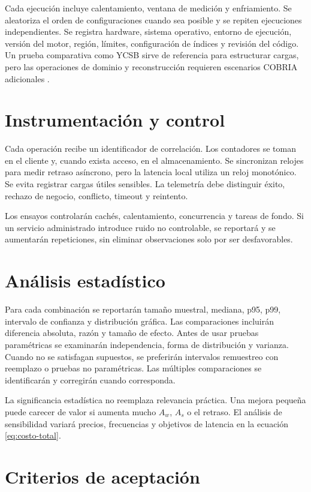 Cada ejecución incluye calentamiento, ventana de medición y enfriamiento. Se aleatoriza
el orden de configuraciones cuando sea posible y se repiten ejecuciones independientes.
Se registra hardware, sistema operativo, entorno de ejecución, versión del motor, región, límites,
configuración de índices y revisión del código. Un prueba comparativa como YCSB sirve de referencia
para estructurar cargas, pero las operaciones de dominio y reconstrucción requieren
escenarios COBRIA adicionales \parencite{cooper2010ycsb}.

\section{Instrumentación y control}

Cada operación recibe un identificador de correlación. Los contadores se toman en el
cliente y, cuando exista acceso, en el almacenamiento. Se sincronizan relojes para medir
retraso asíncrono, pero la latencia local utiliza un reloj monotónico. Se evita registrar
cargas útiles sensibles. La telemetría debe distinguir éxito, rechazo de negocio, conflicto,
timeout y reintento.

Los ensayos controlarán cachés, calentamiento, concurrencia y tareas de fondo. Si un
servicio administrado introduce ruido no controlable, se reportará y se aumentarán
repeticiones, sin eliminar observaciones solo por ser desfavorables.

\section{Análisis estadístico}

Para cada combinación se reportarán tamaño muestral, mediana, p95, p99, intervalo de
confianza y distribución gráfica. Las comparaciones incluirán diferencia absoluta,
razón y tamaño de efecto. Antes de usar pruebas paramétricas se examinarán independencia,
forma de distribución y varianza. Cuando no se satisfagan supuestos, se preferirán
intervalos remuestreo con reemplazo o pruebas no paramétricas. Las múltiples comparaciones se
identificarán y corregirán cuando corresponda.

La significancia estadística no reemplaza relevancia práctica. Una mejora pequeña puede
carecer de valor si aumenta mucho $A_w$, $A_s$ o el retraso. El análisis de sensibilidad
variará precios, frecuencias y objetivos de latencia en la ecuación
\ref{eq:costo-total}.

\section{Criterios de aceptación}

